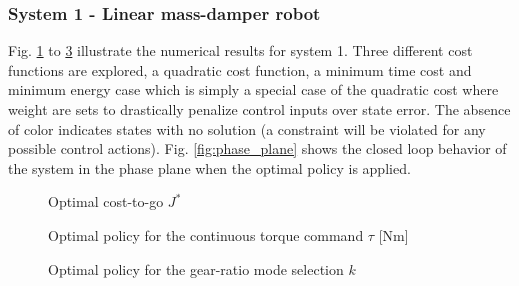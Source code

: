 \subsubsection{System 1 - Linear mass-damper robot}
Fig. \ref{fig:J} to \ref{fig:u1} illustrate the numerical results for system 1. Three different cost functions are explored, a quadratic cost function, a minimum time cost and minimum energy case which is simply a special case of the quadratic cost where weight are sets to drastically penalize control inputs over state error. The absence of color indicates states with no solution (a constraint will be violated for any possible control actions). Fig. \ref{fig:phase_plane} shows the closed loop behavior of the system in the phase plane when the optimal policy is applied.
%
\begin{figure}[p]
				\vspace{-2pt}
        \centering
        \caption[Optimal cost-to-go]{Optimal cost-to-go $J^*$}\label{fig:J}
\end{figure}
%
\begin{figure}[p]
				\vspace{-2pt}
        \centering
        \caption[Optimal policy for the continuous torque command]{Optimal policy for the continuous torque command $\tau$ [Nm]}\label{fig:u0}
\end{figure}
%
\begin{figure}[p]
				\vspace{-2pt}
        \centering
        \caption[Optimal policy for the gear-ratio mode selection]{Optimal policy for the gear-ratio mode selection $k$}\label{fig:u1}
\end{figure}
